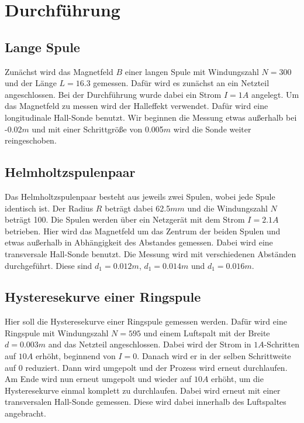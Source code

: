 \section{Durchführung}
\label{sec:Durchführung}

\subsection{Lange Spule}
\label{sec:LangeSpule}

Zunächst wird das Magnetfeld $B$ einer langen Spule mit Windungszahl $N = 300$ und der Länge $L = 16.3$ gemessen.
Dafür wird es zunächst an ein Netzteil angeschlossen. Bei der Durchführung wurde dabei ein Strom $I = 1A$ angelegt.
Um das Magnetfeld zu messen wird der Halleffekt verwendet.
Dafür wird eine longitudinale Hall-Sonde benutzt.
Wir beginnen die Messung etwas außerhalb bei -0.02$m$ und mit einer Schrittgröße von 0.005$m$ wird die Sonde weiter reingeschoben.

\subsection{Helmholtzspulenpaar}
\label{sec:Spulenpaar}

Das Helmholtzspulenpaar besteht aus jeweils zwei Spulen, wobei jede Spule identisch ist.
Der Radius $R$ beträgt dabei 62.5$mm$ und die Windungszahl $N$ beträgt 100.
Die Spulen werden über ein Netzgerät mit dem Strom $I = 2.1A$ betrieben. 
Hier wird das Magnetfeld um das Zentrum der beiden Spulen und etwas außerhalb in Abhängigkeit des Abstandes gemessen.
Dabei wird eine transversale Hall-Sonde benutzt.
Die Messung wird mit verschiedenen Abständen durchgeführt.
Diese sind $d_{1} = 0.012m$, $d_{1} = 0.014m$ und $d_{1} = 0.016m$.

\subsection{Hysteresekurve einer Ringspule}
\label{sec:Hysteresekurve}

Hier soll die Hysteresekurve einer Ringspule gemessen werden.
Dafür wird eine Ringspule mit Windungszahl $N = 595$ und einem Luftspalt mit der Breite $d = 0.003m$ and das Netzteil angeschlossen.
Dabei wird der Strom in $1A$-Schritten auf $10A$ erhöht, beginnend von $I = 0$.
Danach wird er in der selben Schrittweite auf 0 reduziert.
Dann wird umgepolt und der Prozess wird erneut durchlaufen.
Am Ende wird nun erneut umgepolt und wieder auf $10A$ erhöht, um die Hysteresekurve einmal komplett zu durchlaufen.
Dabei wird erneut mit einer transversalen Hall-Sonde gemessen.
Diese wird dabei innerhalb des Luftspaltes angebracht.